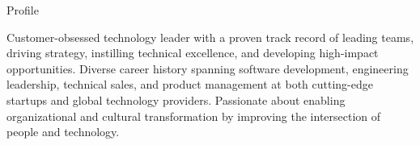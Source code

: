 \documentclass{resume} %
\begin{document}
\begin{rSection}{Profile}
  
  Customer-obsessed technology leader with a proven track record of leading teams, driving strategy, instilling technical excellence, and developing high-impact opportunities. Diverse career history spanning software development, engineering leadership, technical sales, and product management at both cutting-edge startups and global technology providers. Passionate about enabling organizational and cultural transformation by improving the intersection of people and technology.
  
\end{rSection}

\end{document}
